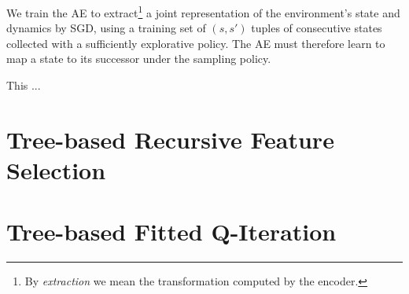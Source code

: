We train the AE to extract\footnote{By \textit{extraction} we mean the 
transformation computed by the encoder.} a joint representation of the 
environment's state and dynamics by SGD, using a training set of $(s, s')$ 
tuples of consecutive states collected with a sufficiently explorative policy. 
The AE must therefore learn to map a state to its successor under the sampling 
policy. 

This ...

\section{Tree-based Recursive Feature Selection}

\section{Tree-based Fitted Q-Iteration}
